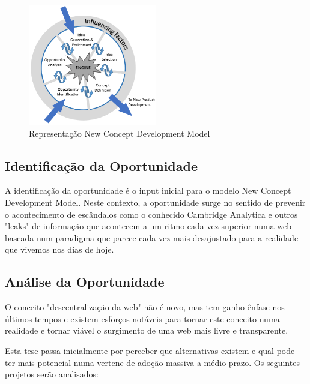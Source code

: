 \begin{figure}[h]
    \begin{center}
    \includegraphics[width=0.5\textwidth]{figures/The-New-Concept-Development-NCD-model-Koen-et-al-2001.png}
    \caption{Representação New Concept Development Model}
    \end{center}
\end{figure}

\subsection{Identificação da Oportunidade}
A identificação da oportunidade é o input inicial para o modelo New Concept Development Model.
Neste contexto, a oportunidade surge no sentido de prevenir o acontecimento de escândalos como o conhecido Cambridge Analytica e outros "leaks" de informação que acontecem a um ritmo cada vez superior numa web baseada num paradigma que parece cada vez mais desajustado para a realidade que vivemos nos dias de hoje.

\subsection{Análise da Oportunidade}
O conceito "descentralização da web" não é novo, mas tem ganho ênfase nos últimos tempos e existem esforços notáveis para tornar este conceito numa realidade e tornar viável o surgimento de uma web mais livre e transparente.

Esta tese passa inicialmente por perceber que alternativas existem e qual pode ter mais potencial numa vertene de adoção massiva a médio prazo. Os seguintes projetos serão analisados:

